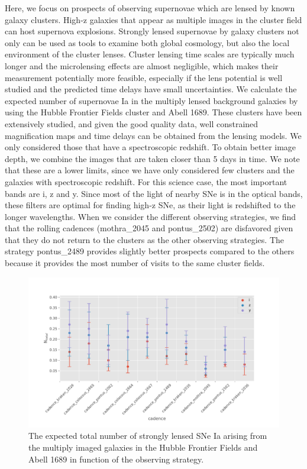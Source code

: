 Here, we focus on prospects of observing supernovae which are
lensed by known galaxy clusters. High-z galaxies that appear as
multiple images in the cluster field can host supernova
explosions. Strongly lensed supernovae by galaxy clusters not only
can be used as tools to examine both global cosmology, but also
the local environment of the cluster lenses. Cluster lensing time
scales are typically much longer and the microlensing effects are
almost negligible, which makes their measurement potentially more
feasible, especially if the lens potential is well studied and the
predicted time delays have small uncertainties. We calculate the
expected number of supernovae Ia in the multiply lensed background
galaxies by using the Hubble Frontier Fields cluster and Abell
1689. These clusters have been extensively studied, and given the
good quality data, well constrained magnification maps and time
delays can be obtained from the lensing models. We only considered
those that have a spectroscopic redshift. To obtain better image
depth, we combine the images that are taken closer than 5 days in
time. We note that these are a lower limits, since we have only
considered few clusters and the galaxies with spectroscopic
redshift. For this science case, the most important bands are i, z
and y. Since most of the light of nearby SNe is in the optical
bands, these filters are optimal for finding high-z SNe, as their
light is redshifted to the longer wavelengths. When we consider
the different observing strategies, we find that the rolling
cadences (mothra\_2045 and pontus\_2502) are disfavored given that
they do not return to the clusters as the other observing
strategies. The strategy pontus\_2489 provides slightly better
prospects compared to the others because it provides the most
number of visits to the same cluster fields.

\begin{figure}
\centering
\includegraphics[scale=0.65]{figures/sl_galaxy_lensing.pdf}\caption{The expected total number of strongly lensed SNe Ia arising from the multiply imaged galaxies in the Hubble Frontier Fields and Abell 1689 in function of the observing strategy. }
\end{figure}


